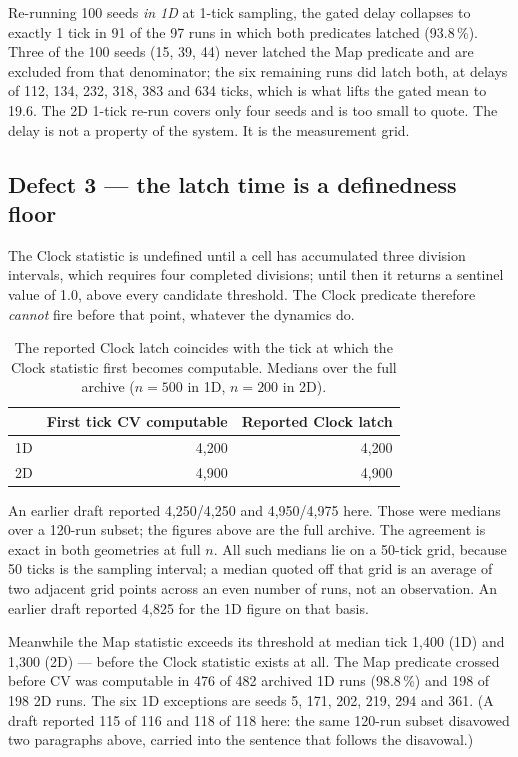 \documentclass[11pt,letterpaper]{article}
\begin{document}
Re-running 100 seeds \emph{in 1D} at 1-tick sampling, the gated delay
collapses to exactly 1 tick in 91 of the 97 runs in which both
predicates latched (93.8\,\%). Three of the 100 seeds (15, 39, 44)
never latched the Map predicate and are excluded from that denominator;
the six remaining runs did latch both, at delays of 112, 134, 232, 318,
383 and 634 ticks, which is what lifts the gated mean to 19.6. The
2D 1-tick re-run covers only four seeds and is too small to quote. The
delay is not a property of the system. It is the measurement grid.

\subsection{Defect 3 --- the latch time is a definedness floor}

The Clock statistic is undefined until a cell has accumulated three
division intervals, which requires four completed divisions; until then
it returns a sentinel value of 1.0, above every candidate threshold.
The Clock predicate therefore \emph{cannot} fire before that point,
whatever the dynamics do.

\begin{table}[H]
\centering
\caption{The reported Clock latch coincides with the tick at which the
Clock statistic first becomes computable. Medians over the full
archive ($n = 500$ in 1D, $n = 200$ in 2D).}
\begin{tabular}{lrr}
\toprule
& First tick CV computable & Reported Clock latch \\
\midrule
1D & 4{,}200 & 4{,}200 \\
2D & 4{,}900 & 4{,}900 \\
\bottomrule
\end{tabular}
\end{table}

An earlier draft reported 4{,}250/4{,}250 and 4{,}950/4{,}975 here.
Those were medians over a 120-run subset; the figures above are the full
archive. The agreement is exact in both geometries at full $n$. All such
medians lie on a 50-tick grid, because 50 ticks is the sampling
interval; a median quoted off that grid is an average of two adjacent
grid points across an even number of runs, not an observation. An
earlier draft reported 4{,}825 for the 1D figure on that basis.

Meanwhile the Map statistic exceeds its threshold at median tick 1{,}400
(1D) and 1{,}300 (2D) --- before the Clock statistic exists at all. The
Map predicate crossed before CV was computable in 476 of 482 archived 1D
runs (98.8\,\%) and 198 of 198 2D runs. The six 1D exceptions are seeds
5, 171, 202, 219, 294 and 361. (A draft reported 115 of 116 and 118 of
118 here: the same 120-run subset disavowed two paragraphs above,
carried into the sentence that follows the disavowal.)
\end{document}
